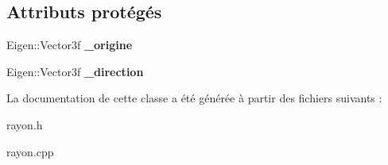 \subsection*{Attributs protégés}
\begin{DoxyCompactItemize}
\item 
\hypertarget{class_rayon_a2a57e8cdc815851eda6a6ac1bd2c0791}{}Eigen\+::\+Vector3f {\bfseries \+\_\+origine}\label{class_rayon_a2a57e8cdc815851eda6a6ac1bd2c0791}

\item 
\hypertarget{class_rayon_a61a4c9a33329d9c59871a88b972a3b97}{}Eigen\+::\+Vector3f {\bfseries \+\_\+direction}\label{class_rayon_a61a4c9a33329d9c59871a88b972a3b97}

\end{DoxyCompactItemize}


La documentation de cette classe a été générée à partir des fichiers suivants \+:\begin{DoxyCompactItemize}
\item 
rayon.\+h\item 
rayon.\+cpp\end{DoxyCompactItemize}
